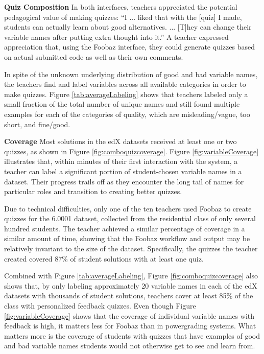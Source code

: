 \textbf{Quiz Composition} In both interfaces, teachers appreciated the potential pedagogical value of making quizzes: ``I ... liked that with the [quiz] I made, students can actually learn about good alternatives. ... [T]hey can change their variable names after putting extra thought into it.'' A teacher expressed appreciation that, using the Foobaz interface, they could generate quizzes based on actual submitted code as well as their own comments. 

In spite of the unknown underlying distribution of good and bad variable names, the teachers find and label variables across all available categories in order to make quizzes. Figure \ref{tab:averageLabeling} shows that teachers labeled only a small fraction of the total number of unique names and still found multiple examples for each of the categories of quality, which are misleading/vague, too short, and fine/good.

\textbf{Coverage} Most solutions in the edX datasets received at least one or two quizzes, as shown in Figure \ref{fig:comboquizcoverage}. Figure \ref{fig:variableCoverage} illustrates that, within minutes of their first interaction with the system, a teacher can label a significant portion of student-chosen variable names in a dataset. Their progress trails off as they encounter the long tail of names for particular roles and transition to creating better quizzes.

Due to technical difficulties, only one of the ten teachers used Foobaz to create quizzes for the 6.0001 dataset, collected from the residential class of only several hundred students. The teacher achieved a similar percentage of coverage in a similar amount of time, showing that the Foobaz workflow and output may be relatively invariant to the size of the dataset. Specifically, the quizzes the teacher created covered 87\% of student solutions with at least one quiz.

Combined with Figure \ref{tab:averageLabeling}, Figure \ref{fig:comboquizcoverage} also shows that, by only labeling approximately 20 variable names in each of the edX datasets with thousands of student solutions, teachers cover at least 85\% of the class with personalized feedback quizzes. Even though Figure \ref{fig:variableCoverage} shows that the coverage of individual variable names with feedback is high, it matters less for Foobaz than in powergrading systems. What matters more is the coverage of students with quizzes that have examples of good and bad variable names students would not otherwise get to see and learn from.

